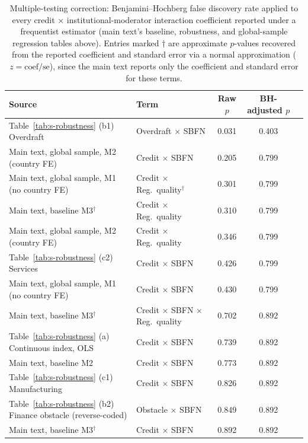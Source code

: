 \documentclass[12pt]{article}
\begin{document}
\begin{table}[htbp]
\centering
\caption{Multiple-testing correction: Benjamini--Hochberg false discovery rate applied to every
credit $\times$ institutional-moderator interaction coefficient reported under a frequentist
estimator (main text's baseline, robustness, and global-sample regression tables above). Entries
marked $\dagger$ are approximate $p$-values recovered from the reported coefficient and standard
error via a normal approximation ($z=\text{coef}/\text{se}$), since the main text reports only the
coefficient and standard error for these terms.}
\label{tab:s-fdr}
\begin{footnotesize}
\begin{tabular}{llccc}
\toprule
Source & Term & Raw $p$ & BH-adjusted $p$ \\
\midrule
Table~\ref{tab:s-robustness} (b1) Overdraft & Overdraft $\times$ SBFN & 0.031 & 0.403 \\
Main text, global sample, M2 (country FE) & Credit $\times$ SBFN & 0.205 & 0.799 \\
Main text, global sample, M1 (no country FE) & Credit $\times$ Reg.\ quality$^\dagger$ & 0.301 & 0.799 \\
Main text, baseline M3$^\dagger$ & Credit $\times$ Reg.\ quality & 0.310 & 0.799 \\
Main text, global sample, M2 (country FE) & Credit $\times$ Reg.\ quality & 0.346 & 0.799 \\
Table~\ref{tab:s-robustness} (c2) Services & Credit $\times$ SBFN & 0.426 & 0.799 \\
Main text, global sample, M1 (no country FE) & Credit $\times$ SBFN & 0.430 & 0.799 \\
Main text, baseline M3$^\dagger$ & Credit $\times$ SBFN $\times$ Reg.\ quality & 0.702 & 0.892 \\
Table~\ref{tab:s-robustness} (a) Continuous index, OLS & Credit $\times$ SBFN & 0.739 & 0.892 \\
Main text, baseline M2 & Credit $\times$ SBFN & 0.773 & 0.892 \\
Table~\ref{tab:s-robustness} (c1) Manufacturing & Credit $\times$ SBFN & 0.826 & 0.892 \\
Table~\ref{tab:s-robustness} (b2) Finance obstacle (reverse-coded) & Obstacle $\times$ SBFN & 0.849 & 0.892 \\
Main text, baseline M3$^\dagger$ & Credit $\times$ SBFN & 0.892 & 0.892 \\
\bottomrule
\end{tabular}
\end{footnotesize}
\end{table}
\end{document}
